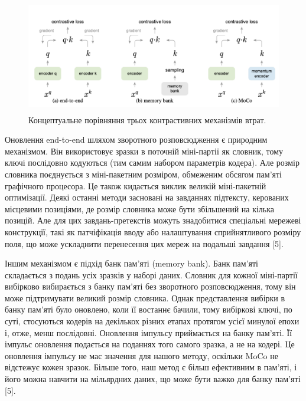 \vspace{1em}

\begin{figure}[h]
  \includegraphics[width=\textwidth, height=5cm, natwidth=474, natheight=193]{Mal/momentum1.jpg}
  \caption{Концептуальне порівняння трьох контрастивних механізмів втрат.}
  \label{fig:momentum1}
\end{figure}

Оновлення end-to-end шляхом зворотного розповсюдження є природним механізмом. Він використовує зразки в поточній міні-партії як словник, тому ключі послідовно кодуються (тим самим набором параметрів кодера). Але розмір словника поєднується з міні-пакетним розміром, обмеженим обсягом пам'яті графічного процесора. Це також кидається виклик великій міні-пакетній оптимізації. Деякі останні методи засновані на завданнях підтексту, керованих місцевими позиціями, де розмір словника може бути збільшений на кілька позицій. Але для цих завдань-претекстів можуть знадобитися спеціальні мережеві конструкції, такі як патчіфікація вводу або налаштування сприйнятливого розміру поля, що може ускладнити перенесення цих мереж на подальші завдання [5].

Іншим механізмом є підхід банк пам'яті (memory bank). Банк пам'яті складається з подань усіх зразків у наборі даних. Словник для кожної міні-партії вибірково вибирається з банку пам'яті без зворотного розповсюдження, тому він може підтримувати великий розмір словника. Однак представлення вибірки в банку пам'яті було оновлено, коли її востаннє бачили, тому вибіркові ключі, по суті, стосуються кодерів на декількох різних етапах протягом усієї минулої епохи і, отже, менш послідовні. Оновлення імпульсу приймається на банку пам'яті. Її імпульс оновлення подається на поданнях того самого зразка, а не на кодері. Це оновлення імпульсу не має значення для нашого методу, оскільки MoCo не відстежує кожен зразок. Більше того, наш метод є більш ефективним в пам’яті, і його можна навчити на мільярдних даних, що може бути важко для банку пам'яті [5].

